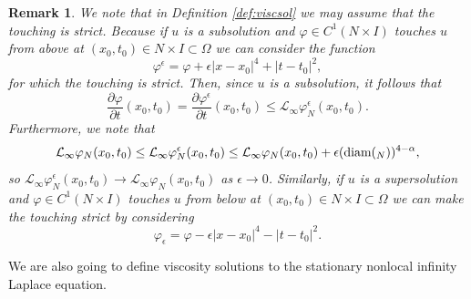 \documentclass[11pt]{article}
\providecommand{\Linf}{\mathcal{L}_{\infty}}
\providecommand{\Ns}{N \times I}
\newtheorem{rmk}[thm]{Remark}
\numberwithin{equation}{section}
\theoremstyle{definition}
\begin{document}
\begin{rmk}\label{rmk:strict_touching}
    We note that in Definition \ref{def:viscsol} we may assume that the touching is strict. Because if $u$ is a subsolution and $\varphi \in C^1(\Ns)$ touches $u$ from above at $(x_0,t_0) \in \Ns \subset \Omega$ we can consider the function
    \begin{equation*}
        \varphi^{\epsilon} = \varphi + \epsilon |x-x_0|^4 + |t-t_0|^2,
    \end{equation*}
    for which the touching is strict. Then, since $u$ is a subsolution, it follows that
    $$
    \frac{\partial \varphi}{\partial t}(x_0,t_0) = \frac{\partial \varphi^{\epsilon}}{\partial t}(x_0,t_0) \leq \Linf \varphi^{\epsilon}_{N}(x_0,t_0).
    $$
    Furthermore, we note that 
    \begin{equation*}
        \Linf \varphi_{N}(x_0,t_0) \leq \Linf \varphi^{\epsilon}_{N}(x_0,t_0) \leq \Linf \varphi_{N}(x_0,t_0)+\epsilon (\textup{diam}(_{N}))^{4-\alpha},
     \end{equation*}
   so  $\Linf \varphi^{\epsilon}_{N}(x_0,t_0) \to \Linf \varphi_{N}(x_0,t_0)$ as $\epsilon \to 0$. 
   Similarly, if $u$ is a supersolution and $\varphi \in C^1(\Ns)$ touches $u$ from below at $(x_0,t_0) \in  \Ns \subset \Omega$ we can make the touching strict by considering
        \begin{equation*}
        \varphi_{\epsilon} = \varphi- \epsilon |x-x_0|^4 - |t-t_0|^2.
    \end{equation*}
\end{rmk}
We are also going to define viscosity solutions to the stationary nonlocal infinity Laplace equation.
\end{document}
